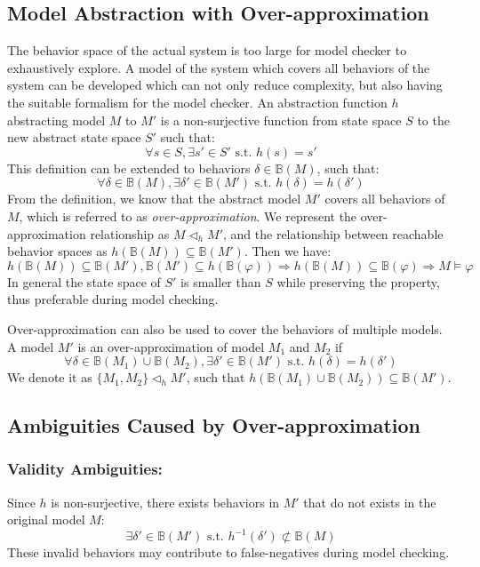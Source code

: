 \subsection{Model Abstraction with Over-approximation}
The behavior space of the actual system is too large for model checker to exhaustively explore. A model of the system which covers all behaviors of the system can be developed which can not only reduce complexity, but also having the suitable formalism for the model checker. An abstraction function $h$ abstracting model $M$ to $M'$ is a non-surjective function from state space $S$ to the new abstract state space $S'$ such that: 
$$\forall s\in S, \exists s'\in S' \text{ s.t. } h(s)=s'$$
This definition can be extended to behaviors $\delta\in \mathbb{B}(M)$, such that:
$$\forall \delta\in \mathbb{B}(M),\exists \delta'\in\mathbb{B}(M')\text{ s.t. } h(\delta)=h(\delta')$$
From the definition, we know that the abstract model $M'$ covers all behaviors of $M$, which is referred to as \emph{over-approximation}. We represent the over-approximation relationship as $M\triangleleft_h M'$, and the relationship between reachable behavior spaces as $h(\mathbb{B}(M))\subseteq\mathbb{B}(M')$. Then we have:
$$h(\mathbb{B}(M))\subseteq \mathbb{B}(M'),\mathbb{B}(M')\subseteq h(\mathbb{B}(\varphi))\Rightarrow h(\mathbb{B}(M))\subseteq \mathbb{B}(\varphi)\Rightarrow M\models\varphi$$
In general the state space of $S'$ is smaller than $S$ while preserving the property, thus preferable during model checking. 

Over-approximation can also be used to cover the behaviors of multiple models. A model $M'$ is an over-approximation of model $M_1$ and $M_2$ if 
$$\forall \delta\in \mathbb{B}(M_1)\cup\mathbb{B}(M_2),\exists \delta'\in\mathbb{B}(M')\text{ s.t. } h(\delta)=h(\delta')$$
We denote it as $\{M_1,M_2\}\triangleleft_h M'$, such that $h(\mathbb{B}(M_1)\cup\mathbb{B}(M_2))\subseteq\mathbb{B}(M')$.

\subsection{Ambiguities Caused by Over-approximation}
\subsubsection{Validity Ambiguities: }
Since $h$ is non-surjective, there exists behaviors in $M'$ that do not exists in the original model $M$:
$$\exists\delta'\in\mathbb{B}(M')\text{ s.t. }h^{-1}(\delta')\not\subset\mathbb{B}(M)$$
These invalid behaviors may contribute to false-negatives during model checking.
